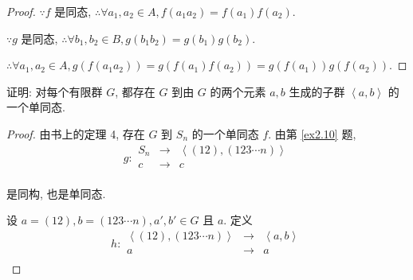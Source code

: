 \documentclass{ctexart}
\begin{document}
\begin{proof}
    $\because f$ 是同态, $\therefore\forall a_1,a_2\in A,f(a_1a_2)=f(a_1)f(a_2)$.

    $\because g$ 是同态, $\therefore\forall b_1,b_2\in B,g(b_1b_2)=g(b_1)g(b_2)$.

    $\therefore\forall a_1,a_2\in A,g(f(a_1a_2))=g(f(a_1)f(a_2))=g(f(a_1))g(f(a_2))$.
\end{proof}
\begin{exercise}[2.18]\label{ex2.18}
    证明: 对每个有限群 $G$, 都存在 $G$ 到由 $G$ 的两个元素 $a,b$ 生成的子群 $\left<a,b\right>$ 的一个单同态.
\end{exercise}
\begin{proof}
    由书上的定理 4, 存在 $G$ 到 $S_n$ 的一个单同态 $f$. 由第 \ref{ex2.10} 题,
    \[g:\begin{array}{rcl}
        S_n & \to & \left<(12),(123\cdots n)\right> \\
        c & \to & c \\
    \end{array}\]

    是同构, 也是单同态.

    设 $a=(12),b=(123\cdots n),a',b'\in G$ 且 $a$. 定义
    \[h:\begin{array}{rcl}
        \left<(12),(123\cdots n)\right> & \to & \left<a,b\right> \\
        a & \to & a \\
    \end{array}\]
\end{proof}
\end{document}
